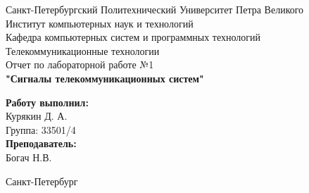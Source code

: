 \documentclass[a4paper]{article}
\begin{document}

\begin{titlepage}	%

	\begin{center}		%

		\large Санкт-Петербургский Политехнический Университет Петра Великого\\
		\large Институт компьютерных наук и технологий \\
		\large Кафедра компьютерных систем и программных технологий\\[6cm]
		
		\huge Телекоммуникационные технологии\\[0.5cm] %
		\large Отчет по лабораторной работе №1 \\[0.1cm]
		\large\textbf{"Сигналы телекоммуникационных систем"}\\[5cm]

	\end{center}


	\begin{flushright} %
		\begin{minipage}{0.25\textwidth} %
			\begin{flushleft} %

				\large\textbf{Работу выполнил:}\\
				\large Курякин Д. А.\\
				\large {Группа:} 33501/4\\
				
				\large \textbf{Преподаватель:}\\
				\large Богач Н.В.\

			\end{flushleft}
		\end{minipage}
	\end{flushright}
	
	\vfill %

	\begin{center}
	\large Санкт-Петербург\\
	\large \the\year %
	\end{center} %

\thispagestyle{empty} %
\end{titlepage} %
\end{document}

